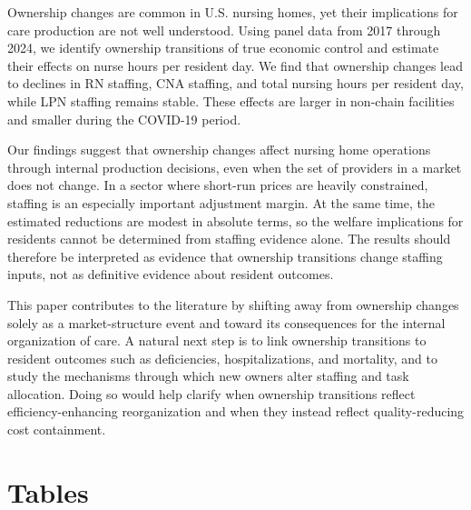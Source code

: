 \documentclass[12pt]{article}
\begin{document}
Ownership changes are common in U.S. nursing homes, yet their implications for care production are not well understood. Using panel data from 2017 through 2024, we identify ownership transitions of true economic control and estimate their effects on nurse hours per resident day. We find that ownership changes lead to declines in RN staffing, CNA staffing, and total nursing hours per resident day, while LPN staffing remains stable. These effects are larger in non-chain facilities and smaller during the COVID-19 period.

Our findings suggest that ownership changes affect nursing home operations through internal production decisions, even when the set of providers in a market does not change. In a sector where short-run prices are heavily constrained, staffing is an especially important adjustment margin. At the same time, the estimated reductions are modest in absolute terms, so the welfare implications for residents cannot be determined from staffing evidence alone. The results should therefore be interpreted as evidence that ownership transitions change staffing inputs, not as definitive evidence about resident outcomes.

This paper contributes to the literature by shifting away from ownership changes solely as a market-structure event and toward its consequences for the internal organization of care. A natural next step is to link ownership transitions to resident outcomes such as deficiencies, hospitalizations, and mortality, and to study the mechanisms through which new owners alter staffing and task allocation. Doing so would help clarify when ownership transitions reflect efficiency-enhancing reorganization and when they instead reflect quality-reducing cost containment.

\singlespacing
\setlength\bibsep{0pt}
\nocite{*}



\clearpage

\onehalfspacing

\section*{Tables} \label{sec:tab}


\FloatBarrier


\FloatBarrier
\end{document}
